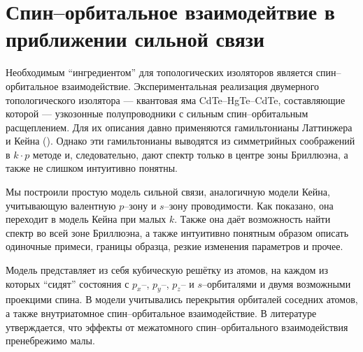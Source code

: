 \section{Спин--орбитальное взаимодейтвие в приближении сильной связи}
Необходимым ``ингредиентом'' для топологических изоляторов является спин--орбитальное 
взаимодействие. Экспериментальная реализация \cite{Bernevig2006, Konig2007} двумерного топологического изолятора ---
квантовая яма CdTe--HgTe--CdTe, составляющие которой --- узкозонные полупроводники с 
сильным спин--орбитальным расщеплением. Для их описания давно применяются
гамильтонианы Латтинжера и Кейна (\cite{Luttinger1956,Kane1957}). Однако эти гамильтонианы
выводятся из симметрийных соображений в $k\cdot p$ методе и, следовательно,
дают спектр только в центре зоны Бриллюэна, а также не слишком интуитивно понятны.

Мы построили простую модель сильной связи, аналогичную модели Кейна, 
учитывающую валентную $p$--зону и $s$--зону проводимости. Как показано, она переходит
в модель Кейна при малых $k$. Также она даёт возможность найти спектр во всей зоне 
Бриллюэна, а также интуитивно понятным образом описать одиночные примеси, границы образца,
резкие изменения параметров и прочее.

Модель представляет из себя 
кубическую решётку из атомов, на каждом из которых ``сидят'' состояния
с $p_x$--, $p_y$--, $p_z$-- и $s$--орбиталями и двумя 
возможными проекцими спина. В модели учитывались перекрытия
орбиталей соседних атомов, а также внутриатомное спин--орбитальное взаимодействие.
В литературе утверждается, что эффекты от межатомного спин--орбитального 
взаимодействия пренебрежимо малы.

